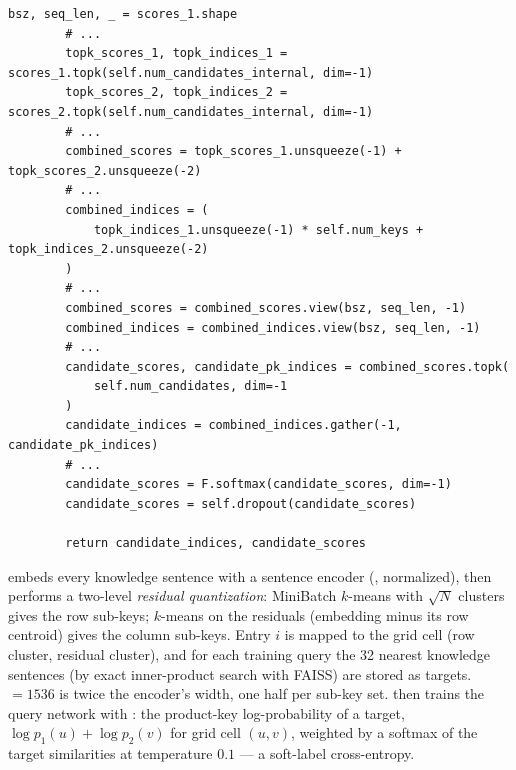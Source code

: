\begin{lstlisting}[caption={Excerpt from \texttt{repos/SCUT-HCC\_\_ExplicitLM/models/memory\_bank/MemoryGate.py} (\texttt{generate\_candidates}; comment lines in Chinese elided).},label={lst:c10-explicit-cand}]
        bsz, seq_len, _ = scores_1.shape
        # ...
        topk_scores_1, topk_indices_1 = scores_1.topk(self.num_candidates_internal, dim=-1)
        topk_scores_2, topk_indices_2 = scores_2.topk(self.num_candidates_internal, dim=-1)
        # ...
        combined_scores = topk_scores_1.unsqueeze(-1) + topk_scores_2.unsqueeze(-2)
        # ...
        combined_indices = (
            topk_indices_1.unsqueeze(-1) * self.num_keys + topk_indices_2.unsqueeze(-2)
        )
        # ...
        combined_scores = combined_scores.view(bsz, seq_len, -1)
        combined_indices = combined_indices.view(bsz, seq_len, -1)
        # ...
        candidate_scores, candidate_pk_indices = combined_scores.topk(
            self.num_candidates, dim=-1
        )
        candidate_indices = combined_indices.gather(-1, candidate_pk_indices)
        # ...
        candidate_scores = F.softmax(candidate_scores, dim=-1)
        candidate_scores = self.dropout(candidate_scores)

        return candidate_indices, candidate_scores
\end{lstlisting}

\begin{implnote}[title={In the code: where the sub-keys come from}]
 embeds every knowledge
sentence with a sentence encoder (, normalized), then performs a
two-level \emph{residual quantization}: MiniBatch $k$-means with $\sqrt{N}$ clusters gives the row
sub-keys; $k$-means on the residuals (embedding minus its row centroid) gives the column
sub-keys. Entry $i$ is mapped to the grid cell (row cluster, residual cluster), and for each training
query the 32 nearest knowledge sentences (by exact inner-product search with FAISS) are stored as
targets.  $= 1536$ is twice the encoder's width, one half per sub-key set.
 then trains the query network with : the product-key
log-probability of a target, $\log p_1(u) + \log p_2(v)$ for grid cell $(u,v)$, weighted by a
softmax of the target similarities at temperature $0.1$ --- a soft-label cross-entropy.
\end{implnote}


